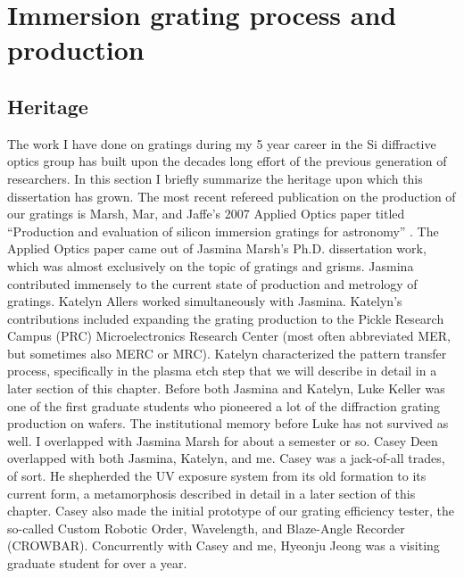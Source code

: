 
\chapter{Immersion grating process and production}

\section{Heritage}

The work I have done on gratings during my 5 year career in the Si diffractive optics group has built upon the decades long effort of the previous generation of researchers.  In this section I briefly summarize the heritage upon which this dissertation has grown.  The most recent refereed publication on the production of our gratings is Marsh, Mar, and Jaffe's 2007 Applied Optics paper titled ``Production and evaluation of silicon immersion gratings for astronomy'' .  The Applied Optics paper came out of Jasmina Marsh's Ph.D. dissertation work, which was almost exclusively on the topic of gratings and grisms.  Jasmina contributed immensely to the current state of production and metrology of gratings.  Katelyn Allers worked simultaneously with Jasmina.  Katelyn's contributions included expanding the grating production to the Pickle Research Campus (PRC) Microelectronics Research Center (most often abbreviated MER, but sometimes also MERC or MRC).  Katelyn characterized the pattern transfer process, specifically in the plasma etch step that we will describe in detail in a later section of this chapter.  Before both Jasmina and Katelyn, Luke Keller was one of the first graduate students who pioneered a lot of the diffraction grating production on wafers.  The institutional memory before Luke has not survived as well.  I overlapped with Jasmina Marsh for about a semester or so.  Casey Deen overlapped with both Jasmina, Katelyn, and me.  Casey was a jack-of-all trades, of sort.  He shepherded the UV exposure system from its old formation to its current form, a metamorphosis described in detail in a later section of this chapter.  Casey also made the initial prototype of our grating efficiency tester, the so-called Custom Robotic Order, Wavelength, and Blaze-Angle Recorder (CROWBAR).  Concurrently with Casey and me, Hyeonju Jeong  was a visiting graduate student for over a year.  

